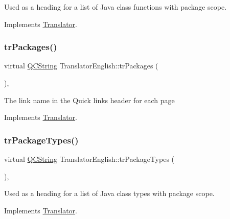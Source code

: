 Used as a heading for a list of Java class functions with package scope. 

Implements \mbox{\hyperlink{class_translator}{Translator}}.

\mbox{\label{class_translator_english_a7c52f5bb4d6c49846957e317548f5fb5}} 
\subsubsection{\texorpdfstring{trPackages()}{trPackages()}}
{\footnotesize\ttfamily virtual \mbox{\hyperlink{class_q_c_string}{Q\+C\+String}} Translator\+English\+::tr\+Packages (\begin{DoxyParamCaption}{ }\end{DoxyParamCaption})\hspace{0.3cm}{\ttfamily [inline]}, {\ttfamily [virtual]}}

The link name in the Quick links header for each page 

Implements \mbox{\hyperlink{class_translator}{Translator}}.

\mbox{\label{class_translator_english_a844e5b539dc7f8ceb884b589f6b025be}} 
\subsubsection{\texorpdfstring{trPackageTypes()}{trPackageTypes()}}
{\footnotesize\ttfamily virtual \mbox{\hyperlink{class_q_c_string}{Q\+C\+String}} Translator\+English\+::tr\+Package\+Types (\begin{DoxyParamCaption}{ }\end{DoxyParamCaption})\hspace{0.3cm}{\ttfamily [inline]}, {\ttfamily [virtual]}}

Used as a heading for a list of Java class types with package scope. 

Implements \mbox{\hyperlink{class_translator}{Translator}}.

\mbox{\label{class_translator_english_a539d34ae570a56474d2a72b832bf1de3}} 
